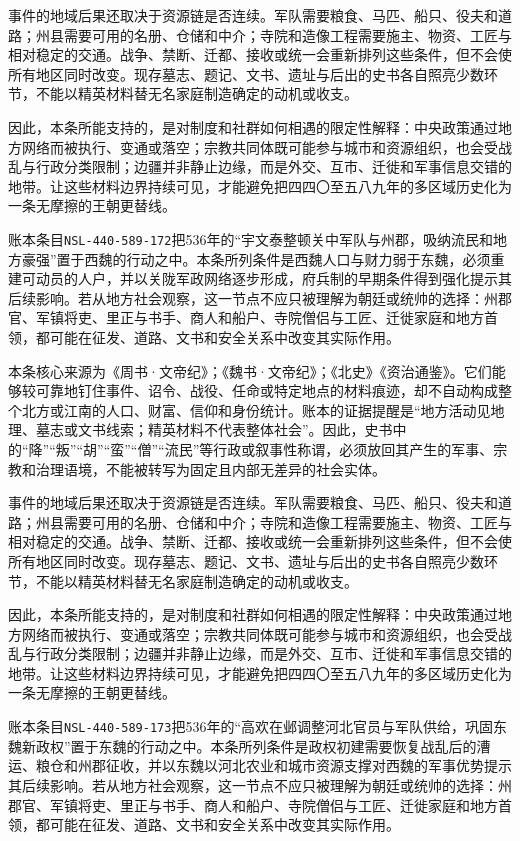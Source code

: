 事件的地域后果还取决于资源链是否连续。军队需要粮食、马匹、船只、役夫和道路；州县需要可用的名册、仓储和中介；寺院和造像工程需要施主、物资、工匠与相对稳定的交通。战争、禁断、迁都、接收或统一会重新排列这些条件，但不会使所有地区同时改变。现存墓志、题记、文书、遗址与后出的史书各自照亮少数环节，不能以精英材料替无名家庭制造确定的动机或收支。

因此，本条所能支持的，是对制度和社群如何相遇的限定性解释：中央政策通过地方网络而被执行、变通或落空；宗教共同体既可能参与城市和资源组织，也会受战乱与行政分类限制；边疆并非静止边缘，而是外交、互市、迁徙和军事信息交错的地带。让这些材料边界持续可见，才能避免把四四〇至五八九年的多区域历史化为一条无摩擦的王朝更替线。

账本条目\texttt{NSL-440-589-172}把536年的“宇文泰整顿关中军队与州郡，吸纳流民和地方豪强”置于西魏的行动之中。本条所列条件是西魏人口与财力弱于东魏，必须重建可动员的人户，并以关陇军政网络逐步形成，府兵制的早期条件得到强化提示其后续影响。若从地方社会观察，这一节点不应只被理解为朝廷或统帅的选择：州郡官、军镇将吏、里正与书手、商人和船户、寺院僧侣与工匠、迁徙家庭和地方首领，都可能在征发、道路、文书和安全关系中改变其实际作用。

本条核心来源为《周书·文帝纪》；《魏书·文帝纪》；《北史》《资治通鉴》。它们能够较可靠地钉住事件、诏令、战役、任命或特定地点的材料痕迹，却不自动构成整个北方或江南的人口、财富、信仰和身份统计。账本的证据提醒是“地方活动见地理、墓志或文书线索；精英材料不代表整体社会”。因此，史书中的“降”“叛”“胡”“蛮”“僧”“流民”等行政或叙事性称谓，必须放回其产生的军事、宗教和治理语境，不能被转写为固定且内部无差异的社会实体。

事件的地域后果还取决于资源链是否连续。军队需要粮食、马匹、船只、役夫和道路；州县需要可用的名册、仓储和中介；寺院和造像工程需要施主、物资、工匠与相对稳定的交通。战争、禁断、迁都、接收或统一会重新排列这些条件，但不会使所有地区同时改变。现存墓志、题记、文书、遗址与后出的史书各自照亮少数环节，不能以精英材料替无名家庭制造确定的动机或收支。

因此，本条所能支持的，是对制度和社群如何相遇的限定性解释：中央政策通过地方网络而被执行、变通或落空；宗教共同体既可能参与城市和资源组织，也会受战乱与行政分类限制；边疆并非静止边缘，而是外交、互市、迁徙和军事信息交错的地带。让这些材料边界持续可见，才能避免把四四〇至五八九年的多区域历史化为一条无摩擦的王朝更替线。

账本条目\texttt{NSL-440-589-173}把536年的“高欢在邺调整河北官员与军队供给，巩固东魏新政权”置于东魏的行动之中。本条所列条件是政权初建需要恢复战乱后的漕运、粮仓和州郡征收，并以东魏以河北农业和城市资源支撑对西魏的军事优势提示其后续影响。若从地方社会观察，这一节点不应只被理解为朝廷或统帅的选择：州郡官、军镇将吏、里正与书手、商人和船户、寺院僧侣与工匠、迁徙家庭和地方首领，都可能在征发、道路、文书和安全关系中改变其实际作用。

